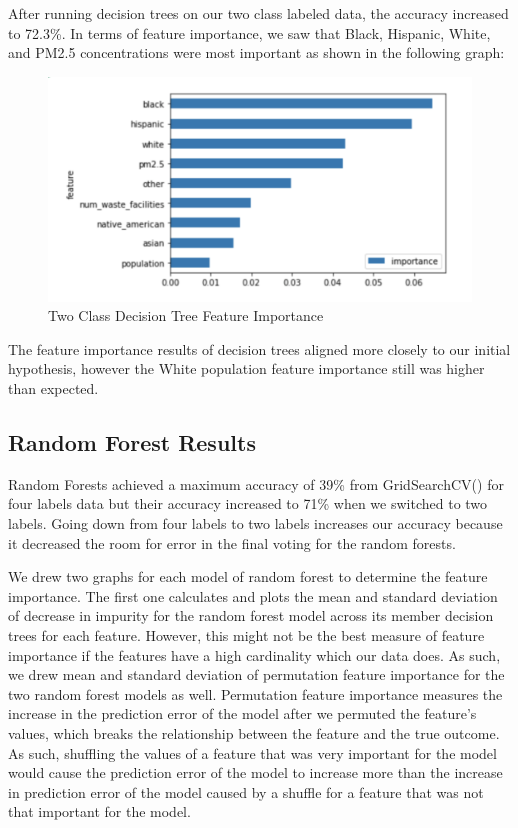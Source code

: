 \documentclass{article}
\begin{document}
After running decision trees on our two class labeled data, the accuracy increased to 72.3\%. In terms of feature importance, we saw that Black, Hispanic, White, and PM2.5 concentrations were most important as shown in the following graph: 

\begin{figure}[h]
\caption{Two Class Decision Tree Feature Importance}
\includegraphics[scale=0.45]{2ClassDT.png}
\end{figure} 

The feature importance results of decision trees aligned more closely to our initial hypothesis, however the White population feature importance still was higher than expected. 

\subsection{Random Forest Results}
\label{random forest results}
Random Forests achieved a maximum accuracy of 39\% from GridSearchCV() for four labels data but their accuracy increased to 71\% when we switched to two labels. Going down from four labels to two labels increases our accuracy because it decreased the room for error in the final voting for the random forests. 

We drew two graphs for each model of random forest to determine the feature importance. The first one calculates and plots the mean and standard deviation of decrease in impurity for the random forest model across its member decision trees for each feature. However, this might not be the best measure of feature importance if the features have a high cardinality which our data does. As such, we drew mean and standard deviation of permutation feature importance for the two random forest models as well. Permutation feature importance measures the increase in the prediction error of the model after we permuted the feature's values, which breaks the relationship between the feature and the true outcome. As such, shuffling the values of a feature that was very important for the model would cause the prediction error of the model to increase more than the increase in prediction error of the model caused by a shuffle for a feature that was not that important for the model. 
\end{document}
